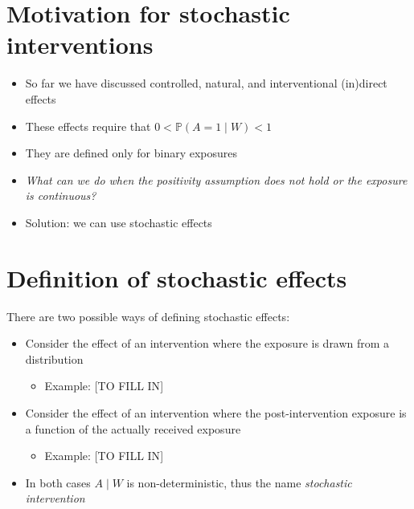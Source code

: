 \documentclass[
  12pt,
]{book}
\providecommand{\tightlist}{%
  \setlength{\itemsep}{0pt}\setlength{\parskip}{0pt}}
\theoremstyle{definition}
\theoremstyle{definition}
\theoremstyle{definition}
\renewcommand{\P}{\mathbb{P}}
\newcommand{\1}{\mathbbm{1}}
\begin{document}
\hypertarget{motivation-for-stochastic-interventions}{%
\section{Motivation for stochastic interventions}\label{motivation-for-stochastic-interventions}}

\begin{itemize}
\tightlist
\item
  So far we have discussed controlled, natural, and interventional (in)direct effects
\item
  These effects require that \(0 < \P(A=1\mid W) < 1\)
\item
  They are defined only for binary exposures
\item
  \emph{What can we do when the positivity assumption does not hold or the exposure
  is continuous?}
\item
  Solution: we can use stochastic effects
\end{itemize}

\hypertarget{definition-of-stochastic-effects}{%
\section{Definition of stochastic effects}\label{definition-of-stochastic-effects}}

There are two possible ways of defining stochastic effects:

\begin{itemize}
\tightlist
\item
  Consider the effect of an intervention where the exposure is drawn from a
  distribution

  \begin{itemize}
  \tightlist
  \item
    Example: {[}TO FILL IN{]}
  \end{itemize}
\item
  Consider the effect of an intervention where the post-intervention exposure is
  a function of the actually received exposure

  \begin{itemize}
  \tightlist
  \item
    Example: {[}TO FILL IN{]}
  \end{itemize}
\item
  In both cases \(A\mid W\) is non-deterministic, thus the name \emph{stochastic intervention}
\end{itemize}
\end{document}
